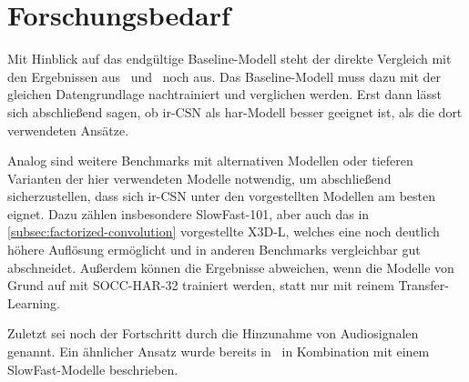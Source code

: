 \section{Forschungsbedarf}
\label{sec:fazit}

Mit Hinblick auf das endgültige Baseline-Modell steht der direkte Vergleich mit den Ergebnissen aus~\cite{Giancola18} und~\cite{Jiang19} noch aus.
Das Baseline-Modell muss dazu mit der gleichen Datengrundlage nachtrainiert und verglichen werden.
Erst dann lässt sich abschließend sagen, ob ir-CSN als \gls{har}-Modell besser geeignet ist, als die dort verwendeten Ansätze.

Analog sind weitere Benchmarks mit alternativen Modellen oder tieferen Varianten der hier verwendeten Modelle notwendig, um abschließend sicherzustellen, dass sich ir-CSN unter den vorgestellten Modellen am besten eignet.
Dazu zählen insbesondere SlowFast-101, aber auch das in \autoref{subsec:factorized-convolution} vorgestellte X3D-L, welches eine noch deutlich höhere Auflösung ermöglicht und in anderen Benchmarks vergleichbar gut abschneidet.
Außerdem können die Ergebnisse abweichen, wenn die Modelle von Grund auf mit SOCC-HAR-32 trainiert werden, statt nur mit reinem Transfer-Learning.

Zuletzt sei noch der Fortschritt durch die Hinzunahme von Audiosignalen genannt.
Ein ähnlicher Ansatz wurde bereits in~\cite{Wang19} in Kombination mit einem SlowFast-Modelle beschrieben.
